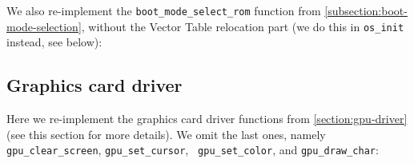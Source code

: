 We also re-implement the {\tt boot\_mode\_select\_rom} function from
\cref{subsection:boot-mode-selection}, without the Vector Table relocation part
(we do this in {\tt os\_init} instead, see below):


\subsection{Graphics card driver}

Here we re-implement the graphics card driver functions from
\cref{section:gpu-driver} (see this section for more details). We omit the last
ones, namely {\tt gpu\_clear\_screen}, {\tt gpu\_set\_cursor}, {\tt
gpu\_set\_color}, and {\tt gpu\_draw\_char}:


